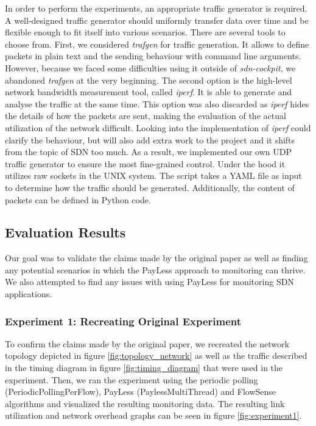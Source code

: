 \documentclass[DIV=12]{scrartcl}
\begin{document}
In order to perform the experiments, an appropriate traffic generator is required. A well-designed traffic generator should uniformly transfer data over time and be flexible enough to fit itself into various scenarios.
There are several tools to choose from. First, we considered \textit{trafgen} for traffic generation. It allows to define packets in plain text and the sending behaviour with command line arguments. However, because we faced some difficulties using it outside of \textit{sdn-cockpit}, we abandoned \textit{trafgen} at the very beginning. The second option is the high-level network bandwidth measurement tool, called \textit{iperf}. It is able to generate and analyse the traffic at the same time. This option was also discarded as \textit{iperf} hides the details of how the packets are sent, making the evaluation of the actual utilization of the network difficult. Looking into the implementation of \textit{iperf} could clarify the behaviour, but will also add extra work to the project and it shifts from the topic of SDN too much. As a result, we implemented our own UDP traffic generator to ensure the most fine-grained control.
Under the hood it utilizes raw sockets in the UNIX system.
The script takes a YAML file as input to determine how the traffic should be generated. Additionally, the content of packets can be defined in Python code.
 
\subsection{Evaluation Results}
\label{subsec:eval}

Our goal was to validate the claims made by the original paper as well as finding
any potential scenarios in which the PayLess approach to monitoring can thrive. We also attempted to find any issues with using PayLess for monitoring SDN applications.

\subsubsection{Experiment 1: Recreating Original Experiment}

To confirm the claims made by the original paper, we recreated the
network topology depicted in figure \ref{fig:topology_network} as well as the traffic described in the timing diagram in figure \ref{fig:timing_diagram} that were used in the experiment. Then, we ran the experiment using the periodic polling (PeriodicPollingPerFlow), PayLess (PaylessMultiThread) and FlowSense algorithms and visualized the resulting monitoring data.
The resulting link utilization and network overhead graphs can be seen in figure \ref{fig:experiment1}.
\end{document}
